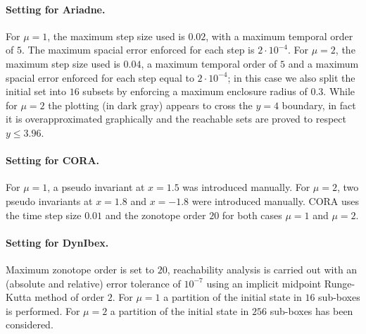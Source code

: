 \documentclass[EPiC]{easychair}
\begin{document}
\paragraph{Setting for Ariadne.}
For $\mu=1$, the maximum step size used is $0.02$, with a maximum temporal order of $5$. The maximum spacial error enforced for each step is $2 \cdot 10^{-4}$. For $\mu=2$, the maximum step size used is $0.04$, a maximum temporal order of $5$ and a maximum spacial error enforced for each step equal to $2 \cdot 10^{-4}$; in this case we also split the initial set into $16$ subsets by enforcing a maximum enclosure radius of $0.3$. While for $\mu=2$ the plotting (in dark gray) appears to cross the $y=4$ boundary, in fact it is overapproximated graphically and the reachable sets are proved to respect $y\leq3.96$.

\paragraph{Setting for CORA.}
For $\mu = 1$, a pseudo invariant at $x=1.5$ was introduced manually. For $\mu = 2$, two pseudo invariants at $x=1.8$ and $x=-1.8$ were introduced manually. CORA uses the time step size $0.01$ and the zonotope order $20$ for both cases $\mu = 1$ and $\mu = 2$.



\paragraph{Setting for DynIbex.}
Maximum zonotope order is set to $20$, reachability analysis is carried out with an (absolute and relative) error tolerance of $10^{-7}$ using an implicit midpoint Runge-Kutta method of order $2$. For $\mu=1$ a partition of the initial state in $16$ sub-boxes is performed. For $\mu=2$ a partition of the initial state in $256$ sub-boxes has been considered.
\end{document}
